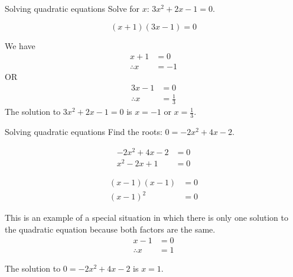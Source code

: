 
        
\begin{wex}
{Solving quadratic equations }
{Solve for $x$: $3{x}^{2}+2x-1=0$.}
{

\begin{equation*}
  (x+1)(3x-1)=0
\end{equation*}

We have
\begin{align*}
  x+1 &= 0 \\
  \therefore x &= -1
\end{align*}
OR
\begin{align*}
  3x-1 &= 0 \\
  \therefore x &= \frac{1}{3}
\end{align*}
The solution to $3{x}^{2}+2x-1=0$ is $x=-1$ or $x=\frac{1}{3}$.
}
\end{wex}


\begin{wex}{Solving quadratic equations}
{Find the roots:  $0=-2{x}^{2}+4x-2$.}
{
\begin{align*}
  -2{x}^{2}+4x-2 &= 0 \\
  {x}^{2}-2x+1 &= 0
\end{align*}


\begin{align*}
  (x-1)(x-1) &= 0 \\
  (x-1)^{2} &= 0
\end{align*}

This is an example of a special situation in which there is only one solution to the quadratic equation because both factors are the same.
\begin{align*}
  x -1 &=  0 \\
  \therefore x & = 1
\end{align*}

 
The solution to $0=-2{x}^{2}+4x-2$ is $x=1$.
}
\end{wex}


